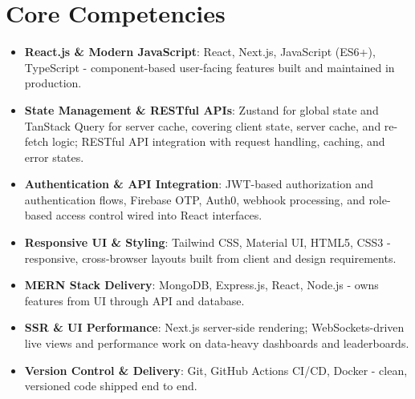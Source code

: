 \documentclass[11pt,a4paper,sans]{moderncv}
\begin{document}
\section{Core Competencies}
\vspace{1pt}
\begin{itemize}

\item \textbf{React.js \& Modern JavaScript}: React, Next.js, JavaScript (ES6+), TypeScript - component-based user-facing features built and maintained in production.

\item \textbf{State Management \& RESTful APIs}: Zustand for global state and TanStack Query for server cache, covering client state, server cache, and re-fetch logic; RESTful API integration with request handling, caching, and error states.

\item \textbf{Authentication \& API Integration}: JWT-based authorization and authentication flows, Firebase OTP, Auth0, webhook processing, and role-based access control wired into React interfaces.

\item \textbf{Responsive UI \& Styling}: Tailwind CSS, Material UI, HTML5, CSS3 - responsive, cross-browser layouts built from client and design requirements.

\item \textbf{MERN Stack Delivery}: MongoDB, Express.js, React, Node.js - owns features from UI through API and database.

\item \textbf{SSR \& UI Performance}: Next.js server-side rendering; WebSockets-driven live views and performance work on data-heavy dashboards and leaderboards.

\item \textbf{Version Control \& Delivery}: Git, GitHub Actions CI/CD, Docker - clean, versioned code shipped end to end.

\end{itemize}

\end{document}
